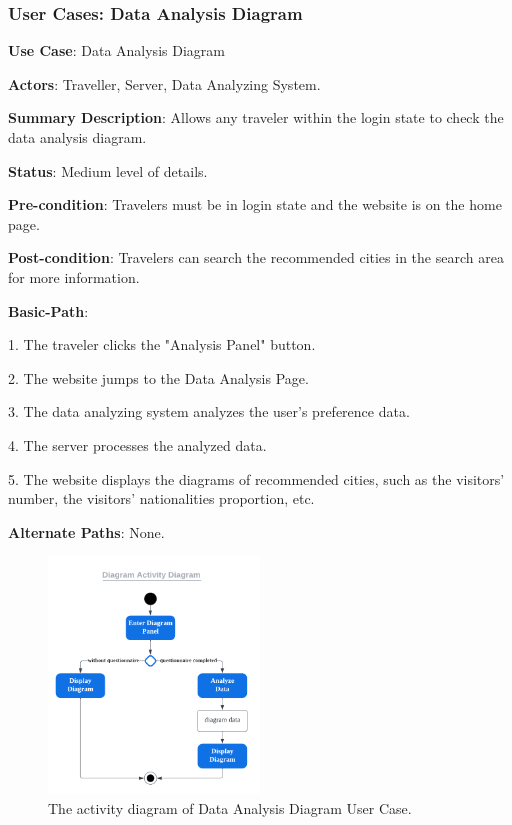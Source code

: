 \documentclass[conference]{IEEEtran}
\begin{document}
\subsubsection{User Cases: Data Analysis Diagram}

\textbf{ }

\textbf{Use Case}: Data Analysis Diagram

\textbf{Actors}: Traveller, Server, Data Analyzing System.

\textbf{Summary Description}: Allows any traveler within the login state to check the data analysis diagram.
 
\textbf{Status}: Medium level of details.

\textbf{Pre-condition}: Travelers must be in login state and the website is on the home page.

\textbf{Post-condition}: Travelers can search the recommended cities in the search area for more information.

\textbf{Basic-Path}:

1. The traveler clicks the "Analysis Panel" button.

2. The website jumps to the Data Analysis Page.

3. The data analyzing system analyzes the user's preference data.

4. The server processes the analyzed data.

5. The website displays the diagrams of recommended cities, such as the visitors' number, the visitors' nationalities proportion, etc.

\textbf{Alternate Paths}: None.

\begin{figure}[htbp]
\centerline{\includegraphics[width=0.5\textwidth]{activity_diagram_diagram.pdf}}
\caption{The activity diagram of Data Analysis Diagram User Case.}
\label{fig5}
\end{figure}
\end{document}
